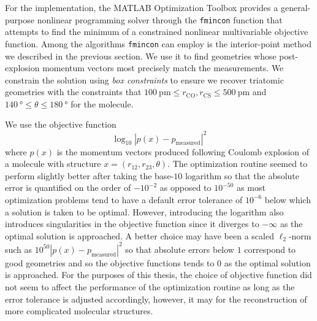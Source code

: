 For the implementation, the MATLAB Optimization Toolbox provides a general-purpose nonlinear programming solver through the \texttt{fmincon} function that attempts to find the minimum of a constrained nonlinear multivariable objective function. Among the algorithms \texttt{fmincon} can employ is the interior-point method we described in the previous section. We use it to find geometries whose post-explosion momentum vectors most precisely match the measurements. We constrain the solution using \emph{box constraints} to ensure we recover triatomic geometries with the constraints that $\SI{100}{\pico\meter} \le r_\mathrm{CO}, r_\mathrm{CS} \le \SI{500}{\pico\meter}$ and $\SI{140}{\degree} \le \theta \le \SI{180}{\degree}$ for the  molecule.

We use the objective function
\begin{equation}
\log_{10}|p(x)-p_\textrm{measured}|^2
\end{equation}
where $p(x)$ is the momentum vectors produced following Coulomb explosion of a molecule with structure $x = (r_{12}, r_{23}, \theta)$. The optimization routine seemed to perform slightly better after taking the base-$10$ logarithm so that the absolute error is quantified on the order of $-10^{-2}$ as opposed to $10^{-50}$ as most optimization problems tend to have a default error tolerance of $10^{-6}$ below which a solution is taken to be optimal. However, introducing the logarithm also introduces singularities in the objective function since it diverges to $-\infty$ as the optimal solution is approached. A better choice may have been a scaled $\ell_2$-norm such as $10^{50}|p(x)-p_\textrm{measured}|^2$ so that absolute errors below $1$ correspond to good geometries and so the objective functions tends to $0$ as the optimal solution is approached. For the purposes of this thesis, the choice of objective function did not seem to affect the performance of the optimization routine as long as the error tolerance is adjusted accordingly, however, it may for the reconstruction of more complicated molecular structures.

